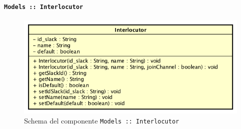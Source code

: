 \documentclass[../DefinizioneDiProdotto_v2.0.0.tex]{subfiles}
\begin{document}
	\newpage
	\paragraph{\texttt{Models :: Interlocutor}}
	\acapo
	\begin{figure}[!h]
		\centering
		\includegraphics[scale=0.6]{Architettura/Front-End/Models/Interlocutor.png}
		\caption{Schema del componente \texttt{Models :: Interlocutor}}
	\end{figure}
\end{document}
